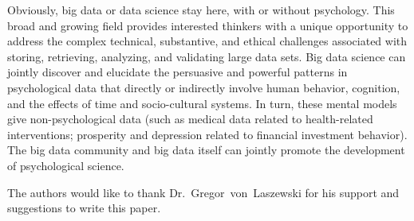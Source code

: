 Obviously, big data or data science stay here, with or without 
psychology. This broad and growing field provides interested 
thinkers with a unique opportunity to address the complex 
technical, substantive, and ethical challenges associated with 
storing, retrieving, analyzing, and validating large data sets. 
Big data science can jointly discover and elucidate the persuasive
 and powerful patterns in psychological data that directly or 
indirectly involve human behavior, cognition, and the effects of 
time and socio-cultural systems. In turn, these mental models give
 non-psychological data (such as medical data related to 
health-related interventions; prosperity and depression related to
 financial investment behavior). The big data community and big 
data itself can jointly promote the development of psychological 
science.


\begin{acks}

  The authors would like to thank Dr.~Gregor~von~Laszewski for his
  support and suggestions to write this paper.

\end{acks}



 


